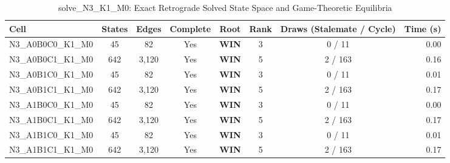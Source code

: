 \begin{table}[htbp]
\centering
\caption{solve\_N3\_K1\_M0: Exact Retrograde Solved State Space and Game-Theoretic Equilibria}
\label{tab:exact_solves}
\begin{tabular}{lccccccr}
\toprule
Cell & States & Edges & Complete & Root & Rank & Draws (Stalemate / Cycle) & Time (s) \\
\midrule
N3\_A0B0C0\_K1\_M0 & 45 & 82 & Yes & \textbf{WIN} & 3 & 0 / 11 & 0.00 \\
N3\_A0B0C1\_K1\_M0 & 642 & 3,120 & Yes & \textbf{WIN} & 5 & 2 / 163 & 0.16 \\
N3\_A0B1C0\_K1\_M0 & 45 & 82 & Yes & \textbf{WIN} & 3 & 0 / 11 & 0.01 \\
N3\_A0B1C1\_K1\_M0 & 642 & 3,120 & Yes & \textbf{WIN} & 5 & 2 / 163 & 0.17 \\
N3\_A1B0C0\_K1\_M0 & 45 & 82 & Yes & \textbf{WIN} & 3 & 0 / 11 & 0.00 \\
N3\_A1B0C1\_K1\_M0 & 642 & 3,120 & Yes & \textbf{WIN} & 5 & 2 / 163 & 0.17 \\
N3\_A1B1C0\_K1\_M0 & 45 & 82 & Yes & \textbf{WIN} & 3 & 0 / 11 & 0.01 \\
N3\_A1B1C1\_K1\_M0 & 642 & 3,120 & Yes & \textbf{WIN} & 5 & 2 / 163 & 0.17 \\
\bottomrule
\end{tabular}
\end{table}
